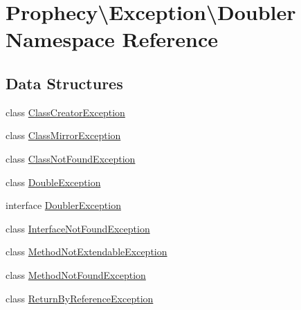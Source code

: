 \hypertarget{namespace_prophecy_1_1_exception_1_1_doubler}{}\section{Prophecy\textbackslash{}Exception\textbackslash{}Doubler Namespace Reference}
\label{namespace_prophecy_1_1_exception_1_1_doubler}
\subsection*{Data Structures}
\begin{DoxyCompactItemize}
\item 
class \mbox{\hyperlink{class_prophecy_1_1_exception_1_1_doubler_1_1_class_creator_exception}{Class\+Creator\+Exception}}
\item 
class \mbox{\hyperlink{class_prophecy_1_1_exception_1_1_doubler_1_1_class_mirror_exception}{Class\+Mirror\+Exception}}
\item 
class \mbox{\hyperlink{class_prophecy_1_1_exception_1_1_doubler_1_1_class_not_found_exception}{Class\+Not\+Found\+Exception}}
\item 
class \mbox{\hyperlink{class_prophecy_1_1_exception_1_1_doubler_1_1_double_exception}{Double\+Exception}}
\item 
interface \mbox{\hyperlink{interface_prophecy_1_1_exception_1_1_doubler_1_1_doubler_exception}{Doubler\+Exception}}
\item 
class \mbox{\hyperlink{class_prophecy_1_1_exception_1_1_doubler_1_1_interface_not_found_exception}{Interface\+Not\+Found\+Exception}}
\item 
class \mbox{\hyperlink{class_prophecy_1_1_exception_1_1_doubler_1_1_method_not_extendable_exception}{Method\+Not\+Extendable\+Exception}}
\item 
class \mbox{\hyperlink{class_prophecy_1_1_exception_1_1_doubler_1_1_method_not_found_exception}{Method\+Not\+Found\+Exception}}
\item 
class \mbox{\hyperlink{class_prophecy_1_1_exception_1_1_doubler_1_1_return_by_reference_exception}{Return\+By\+Reference\+Exception}}
\end{DoxyCompactItemize}
